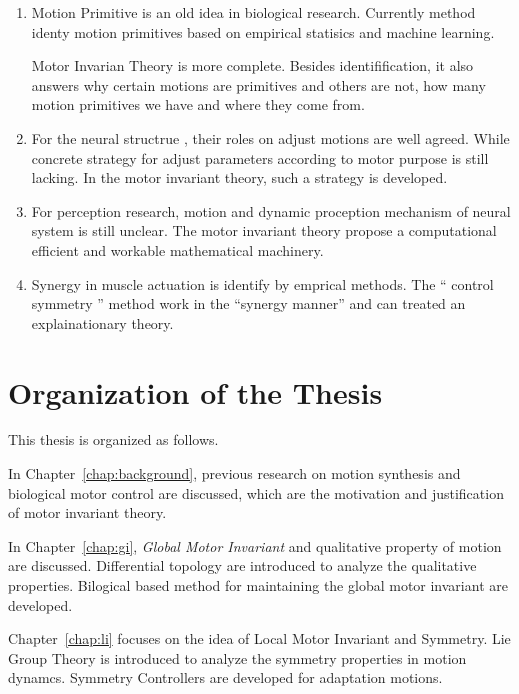 \begin{enumerate}
\item Motion Primitive is an old idea in biological research. 
Currently method identy motion primitives based on empirical statisics and machine learning.

Motor Invarian Theory is more complete.
Besides identifification, it also answers why certain motions are  primitives and others are not,
how many motion primitives we have and where they come from.

\item For the neural structrue \cpg , their roles on adjust motions are well agreed.
While concrete strategy for adjust \cpg parameters according to motor purpose is still lacking.
In the motor invariant theory,  such a strategy is developed.

\item For perception research, motion and dynamic proception mechanism of neural system is still unclear.
The motor invariant theory propose a computational efficient and workable mathematical machinery.

\item Synergy in muscle actuation is identify by emprical methods. 
The `` control symmetry '' method work in the ``synergy manner''  and can treated an explainationary theory.
\end{enumerate}







\section{Organization of the Thesis}

This thesis is organized as follows.
 
In Chapter~\ref{chap:background}, previous research on motion synthesis and biological motor control are discussed, which are the motivation and justification of motor invariant theory.
 
In Chapter~\ref{chap:gi}, \emph{Global Motor Invariant} and qualitative property of motion are discussed. 
Differential topology are introduced to analyze the qualitative properties.
Bilogical based  method for maintaining the global motor invariant are developed.

Chapter~\ref{chap:li} focuses on the idea of Local Motor Invariant and Symmetry.
Lie Group Theory is  introduced  to analyze the symmetry properties in motion dynamcs.
Symmetry Controllers are developed for adaptation motions.
 


